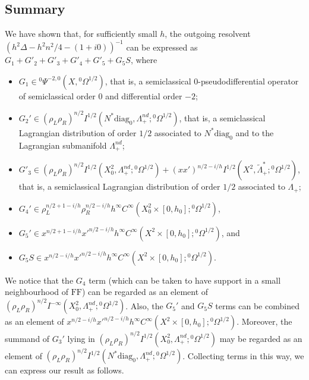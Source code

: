 \documentclass[10pt, a4paper, twoside]{amsart}
\numberwithin{equation}{section}
\theoremstyle{remark}
\begin{document}
\subsection{Summary}
We have shown that, for sufficiently small $h$,  the outgoing resolvent $(h^2 \Delta - h^2n^2/4 - (1 + i0))^{-1}$ can be expressed as $G_1 + G'_2 + G'_3 + G'_4 + G'_5 + G_5 S$, where
\begin{itemize}
\item $G_1 \in {}^0 \Psi^{-2, 0}(X, {{}^0\Omega^{1/2}})$, that is, a semiclassical 0-pseudodifferential operator of semiclassical order $0$ and differential order $-2$;
\item $G_2' \in (\rho_L \rho_R)^{n/2}I^{1/2}(N^* {\mathrm{diag}_0}, \Lambda_+^{nd}; {{}^0\Omega^{1/2}})$, that is, a semiclassical Lagrangian distribution of order $1/2$ associated to $N^* {\mathrm{diag}_0}$ and to the Lagrangian submanifold $\Lambda_+^{nd}$;
\item $G'_3 \in (\rho_L \rho_R)^{n/2} I^{1/2}(X^2_0, \Lambda_+^{nd}; {{}^0\Omega^{1/2}}) + (xx')^{n/2 -i/h} I^{1/2}(X^2, {\tilde \Lambda}_+^*; {{}^0\Omega^{1/2}})$, that is, a semiclassical Lagrangian distribution of order $1/2$ associated to $\Lambda_+$;
\item $G_4' \in  \rho_{L}^{n/2 + 1 -i/h} \rho_R^{n/2 -i/h} h^\infty C^\infty(X^2_0\times [0, h_0]; {{}^0\Omega^{1/2}})$, 
\item $G_5' \in x^{n/2+1 -i/h} {x'}^{n/2 -i/h} h^\infty C^\infty(X^2\times [0, h_0]; {{}^0\Omega^{1/2}})$, and
\item $G_5 S \in  x^{n/2-i/h} {x'}^{n/2-i/h} h^\infty C^\infty(X^2 \times [0, h_0]; {{}^0\Omega^{1/2}})$.
\end{itemize}
We notice that the $G_4$ term (which can be taken to have support in a small neighbourhood of ${\mathrm{FF}}$) can be regarded as an element of $(\rho_L \rho_R)^{n/2} I^{-\infty}(X^2_0, \Lambda_+^{nd}; {{}^0\Omega^{1/2}})$. Also, the $G_5'$ and $G_5 S$ terms can be combined as an  element of $x^{n/2-i/h} {x'}^{n/2-i/h} h^\infty C^\infty(X^2 \times [0, h_0]; {{}^0\Omega^{1/2}})$. 
Moreover, the summand of $G_3'$ lying in $(\rho_L \rho_R)^{n/2} I^{1/2}(X^2_0, \Lambda_+^{nd}; {{}^0\Omega^{1/2}})$ may be regarded as an element of $(\rho_L \rho_R)^{n/2}I^{1/2}(N^* {\mathrm{diag}_0}, \Lambda_+^{nd}; {{}^0\Omega^{1/2}})$. Collecting terms in this way, we can express our result as follows. 
\end{document}
